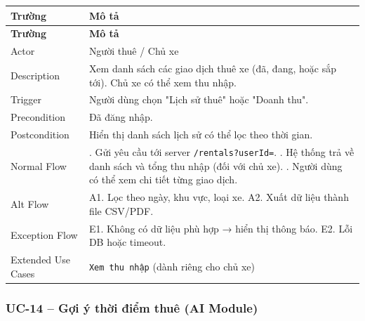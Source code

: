 \begin{longtable}{|>{\raggedright\arraybackslash}p{4cm}|>{\raggedright\arraybackslash}p{11cm}|}
\hline
\textbf{Trường} & \textbf{Mô tả} \\
\hline
\endfirsthead

\hline
\textbf{Trường} & \textbf{Mô tả} \\
\hline
\endhead

\hline
\endfoot

Actor & Người thuê / Chủ xe \\
\hline
Description & Xem danh sách các giao dịch thuê xe (đã, đang, hoặc sắp tới). Chủ xe có thể xem thu nhập. \\
\hline
Trigger & Người dùng chọn "Lịch sử thuê" hoặc "Doanh thu". \\
\hline
Precondition & Đã đăng nhập. \\
\hline
Postcondition & Hiển thị danh sách lịch sử có thể lọc theo thời gian. \\
\hline
Normal Flow & 1. Gửi yêu cầu tới server \texttt{/rentals?userId=}. \newline 2. Hệ thống trả về danh sách và tổng thu nhập (đối với chủ xe). \newline 3. Người dùng có thể xem chi tiết từng giao dịch. \\
\hline
Alt Flow & A1. Lọc theo ngày, khu vực, loại xe. \newline A2. Xuất dữ liệu thành file CSV/PDF. \\
\hline
Exception Flow & E1. Không có dữ liệu phù hợp → hiển thị thông báo. \newline E2. Lỗi DB hoặc timeout. \\
\hline
Extended Use Cases & \texttt{Xem thu nhập} (dành riêng cho chủ xe) \\
\hline
\end{longtable}

\subsubsection*{UC-14 – Gợi ý thời điểm thuê (AI Module)}

